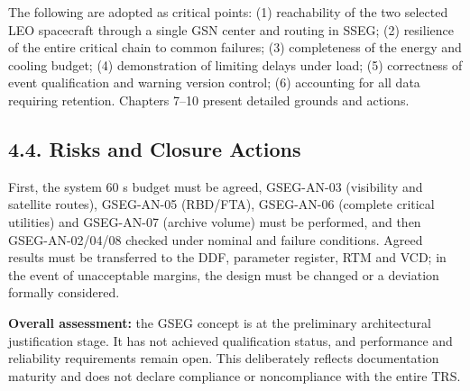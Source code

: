 The following are adopted as critical points: (1) reachability of the two selected LEO spacecraft through a single GSN center and routing in SSEG; (2) resilience of the entire critical chain to common failures; (3) completeness of the energy and cooling budget; (4) demonstration of limiting delays under load; (5) correctness of event qualification and warning version control; (6) accounting for all data requiring retention. Chapters 7–10 present detailed grounds and actions.

\subsection{4.4. Risks and Closure Actions}\label{ddjf-4-4}

First, the system 60 s budget must be agreed, GSEG-AN-03 (visibility and satellite routes), GSEG-AN-05 (RBD/\allowbreak{}FTA), GSEG-AN-06 (complete critical utilities) and GSEG-AN-07 (archive volume) must be performed, and then GSEG-AN-02/\allowbreak{}04/\allowbreak{}08 checked under nominal and failure conditions. Agreed results must be transferred to the DDF, parameter register, RTM and VCD; in the event of unacceptable margins, the design must be changed or a deviation formally considered.

\textbf{Overall assessment:} the GSEG concept is at the preliminary architectural justification stage. It has not achieved qualification status, and performance and reliability requirements remain open. This deliberately reflects documentation maturity and does not declare compliance or noncompliance with the entire TRS.

\par\noindent{\color{TableBorderBlue}\rule{\linewidth}{0.4pt}}\par
